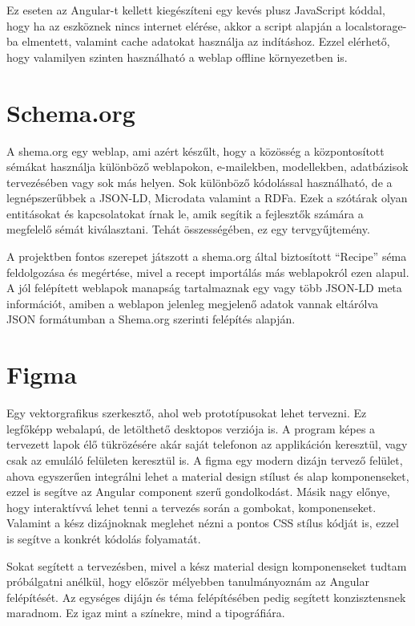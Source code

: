 \documentclass[12pt]{report}
\theoremstyle{definition}
\begin{document}
Ez eseten az Angular-t kellett kiegészíteni egy kevés plusz JavaScript kóddal, hogy ha az eszköznek nincs internet elérése, akkor a script alapján a localstorage-ba elmentett, valamint cache adatokat használja az indításhoz. Ezzel elérhető, hogy valamilyen szinten használható a weblap offline környezetben is.

\section{Schema.org}
A shema.org egy weblap, ami azért készűlt, hogy a közösség a központosított sémákat használja különböző weblapokon, e-mailekben, modellekben, adatbázisok tervezésében vagy sok más helyen. Sok különböző kódolással használható, de a legnépszerűbbek a JSON-LD, Microdata valamint a RDFa. Ezek a szótárak olyan entitásokat és kapcsolatokat írnak le, amik segítik a fejlesztők számára a megfelelő sémát kiválasztani. Tehát összességében, ez egy tervgyűjtemény.

A projektben fontos szerepet játszott a shema.org által biztosított “Recipe” séma feldolgozása és megértése, mivel a recept importálás más weblapokról ezen alapul. A jól felépített weblapok manapság tartalmaznak egy vagy több JSON-LD meta információt, amiben a weblapon jelenleg megjelenő adatok vannak eltárólva JSON formátumban a Shema.org szerinti felépítés alapján.

\section{Figma}
Egy  vektorgrafikus szerkesztő, ahol web prototípusokat lehet tervezni. Ez legfőképp webalapú, de letölthető desktopos verziója is. A program képes a tervezett lapok élő tükrözésére akár saját telefonon az applikáción keresztül, vagy csak az emuláló felületen keresztül is. A figma egy modern dizájn tervező felület, ahova egyszerűen integrálni lehet a material design stílust és alap komponenseket, ezzel is segítve az Angular component szerű gondolkodást. Másik nagy előnye, hogy interaktívvá lehet tenni a tervezés során a gombokat, komponenseket. Valamint a kész dizájnoknak meglehet nézni a pontos CSS stílus kódját is, ezzel is segítve a konkrét kódolás folyamatát.

Sokat segített a tervezésben, mivel a kész material design komponenseket tudtam próbálgatni anélkül, hogy először mélyebben tanulmányoznám az Angular felépítését. Az egységes dijájn és téma felépítésében pedig segített konzisztensnek maradnom. Ez igaz mint a színekre, mind a tipográfiára.
\end{document}
